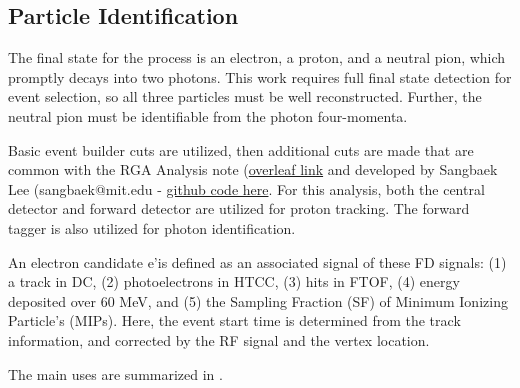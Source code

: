 \subsection{Particle Identification}\label{sec:pid}
    The final state for the \dvpip process is an electron, a proton, and a neutral pion, which promptly decays into two photons. This work requires full final state detection for event selection, so all three particles must be well reconstructed. Further, the neutral pion must be identifiable from the photon four-momenta. 

      Basic event builder cuts are utilized, then additional cuts are made that are common with the RGA Analysis note (\href{https://www.overleaf.com/project/5ea737720942930001ff5e9c}{overleaf link} and developed by Sangbaek Lee (sangbaek@mit.edu - \href{https://github.com/Sangbaek/analysis_code/tree/analysis/pid}{github code here}. For this analysis, both the central detector and forward detector are utilized for proton tracking. The forward tagger is also utilized for photon identification. 


      
An electron candidate e'is defined as an associated signal of these FD signals: (1) a track in DC, (2) photoelectrons in HTCC, (3) hits in FTOF, (4) energy deposited over 60 MeV, and (5) the Sampling Fraction (SF) of Minimum Ionizing Particle’s (MIPs). Here, the event start time is determined from the track information, and corrected by the RF signal and the vertex location. 



    The main uses are summarized in .
 
